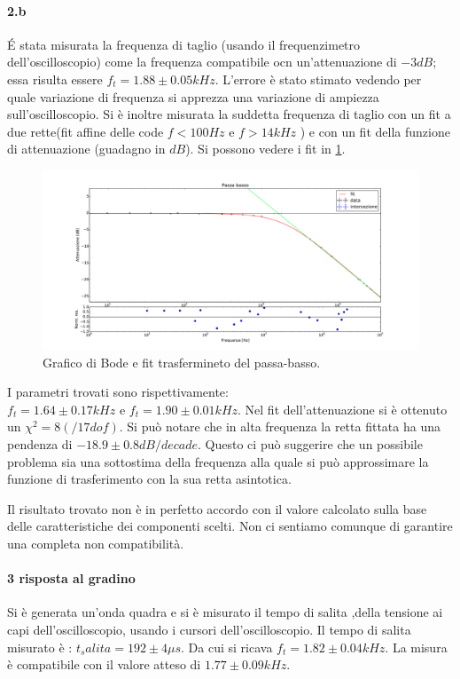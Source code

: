 \documentclass[10pt,a4paper]{article}
\begin{document}
\paragraph{2.b}
\'E stata misurata la frequenza di taglio (usando il frequenzimetro dell'oscilloscopio) come la frequenza compatibile ocn un'attenuazione di $-3dB$; essa risulta essere $f_t =1.88 \pm 0.05 kHz$. L'errore è stato stimato vedendo per quale variazione di frequenza si apprezza una variazione di ampiezza sull'oscilloscopio.
Si è inoltre misurata la suddetta frequenza di taglio con un fit a due rette(fit affine delle code $f<100 Hz$ e $f>14 kHz$  ) e con un fit della funzione di attenuazione (guadagno in $dB$). 
Si possono vedere i fit in \ref{f:fit1}. 
\begin{figure}
\centering
\includegraphics[scale=0.4]{plt_passa_basso.pdf}
\caption{Grafico di Bode e fit trasfermineto del passa-basso.\label{f:fit1}}
\end{figure}

I parametri trovati sono rispettivamente:\\
$f_t=1.64\pm 0.17 kHz$ e $f_t=1.90 \pm 0.01 kHz$. Nel fit dell'attenuazione si è ottenuto un $\chi^2=8 (/17 dof)$.
Si può notare che in alta frequenza la retta fittata ha una pendenza di $-18.9\pm 0.8 dB/decade$. Questo ci può suggerire che un possibile problema sia una sottostima della frequenza alla quale si può approssimare la funzione di trasferimento con la sua retta asintotica.

Il risultato trovato non è in perfetto accordo con il valore calcolato sulla base delle caratteristiche dei componenti scelti. Non ci sentiamo comunque di garantire una completa non compatibilità.


\paragraph{3 risposta al gradino }
Si è generata un'onda quadra e si è misurato il tempo di salita ,della tensione ai capi dell'oscilloscopio, usando i cursori dell'oscilloscopio. Il tempo di salita misurato è : $t_salita = 192 \pm 4 \mu s$.
Da cui si ricava $f_t = 1.82 \pm 0.04 kHz $. La misura è compatibile con il valore atteso di $1.77 \pm 0.09 kHz $.
\end{document}
